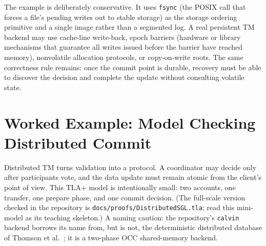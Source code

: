 The example is deliberately conservative. It uses \texttt{fsync} (the POSIX
call that forces a file's pending writes out to stable storage) as the storage
ordering primitive and a single image rather than a segmented log. A real
persistent TM backend may use cache-line write-back, epoch barriers (hardware
or library mechanisms that guarantee all writes issued before the barrier have
reached memory), nonvolatile
allocation protocols, or copy-on-write roots. The same correctness rule remains:
once the commit point is durable, recovery must be able to discover the decision
and complete the update without consulting volatile state.

\section{Worked Example: Model Checking Distributed Commit}
\label{sec:distributed-commit-example}

Distributed TM turns validation into a protocol. A coordinator may decide only
after participants vote, and the data update must remain atomic from the
client's point of view. This TLA+ model is intentionally small: two accounts,
one transfer, one prepare phase, and one commit decision. (The full-scale
version checked in the repository is
\texttt{docs/proofs/\allowbreak DistributedSGL.tla};
read this mini-model as its teaching skeleton.) A naming caution: the
repository's \texttt{calvin} backend borrows its name from, but is not, the
deterministic distributed database of Thomson et al.~\cite{thomson12calvin};
it is a two-phase OCC shared-memory backend.

